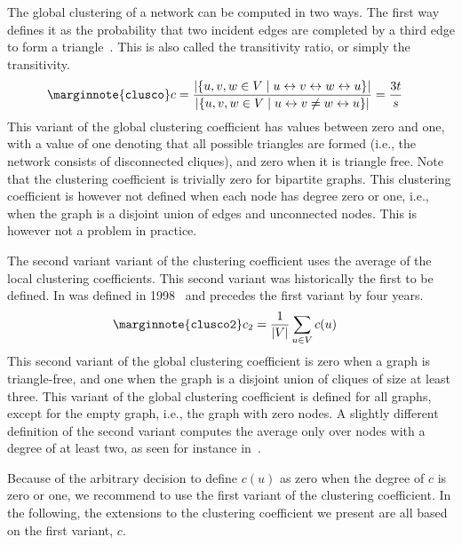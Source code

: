 \documentclass{article}
\begin{document}
The global clustering of a network can be computed in two ways.  The
first way defines it as the probability that two incident edges are
completed by a third edge to form a triangle~\cite{b736}. This is also
called the transitivity ratio, or simply the transitivity.
\begin{align}
  \marginnote{\texttt{clusco}} c &= \frac {|\{ u, v, w \in V \mid u \leftrightarrow
    v \leftrightarrow w \leftrightarrow u \}|} {|\{ u, v, w \in V \mid u \leftrightarrow v \neq w \leftrightarrow u
    \}|} = \frac {3t} s
\end{align}
This variant of the global clustering coefficient has values between
zero and one, with a value of one denoting that all possible triangles
are formed (i.e., the network consists of disconnected cliques), and
zero when it is triangle free.  Note that the clustering coefficient is
trivially zero for bipartite graphs.  This clustering coefficient is
however not defined when each node has degree zero or one, i.e., when
the graph is a disjoint union of edges and unconnected nodes.  This is
however not a problem in practice.

The second variant variant of the clustering coefficient uses the
average of the local clustering coefficients. This second variant was
historically the first to be defined.  In was defined in
1998~\cite{b228} and precedes the first variant by four years.
\begin{align}
  \marginnote{\texttt{clusco2}} c_2 &= \frac 1 {|V|} \sum_{u \in V} c(u)
\end{align}
This second variant of the global clustering coefficient is zero when a
graph is triangle-free, and one when the graph is a disjoint union of
cliques of size at least three.  This variant of the global clustering
coefficient is defined for all graphs, except for the empty graph, i.e.,
the graph with zero nodes.  A slightly different definition of the
second variant computes the average only over nodes with a degree of at
least two, as seen for instance in~\cite{b845}.

Because of the arbitrary decision to define $c(u)$ as zero when the
degree of $c$ is zero or one, we recommend to use the first variant of
the clustering coefficient.  In the following, the extensions to the
clustering coefficient we present are all based on the first variant,
$c$.
\end{document}
